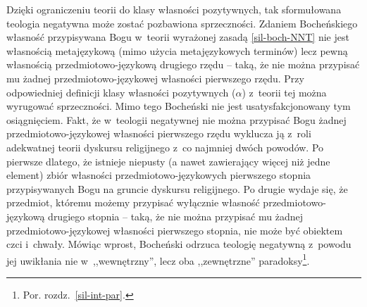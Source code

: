 
Dzięki ograniczeniu teorii do klasy własności pozytywnych, tak sformułowana teologia negatywna może zostać pozbawiona sprzeczności. Zdaniem Bocheńskiego własność przypisywana Bogu w~teorii wyrażonej zasadą \ref{sil-boch-NNT} nie jest własnością metajęzykową (mimo użycia metajęzykowych terminów) lecz pewną własnością prze\-dmio\-to\-wo-językową drugiego rzędu -- taką, że nie można przypisać mu żadnej prze\-dmio\-to\-wo-językowej własności pierwszego rzędu. Przy odpowiedniej definicji klasy własności pozytywnych ($\alpha$) z~teorii tej można wyrugować sprzeczności. Mimo tego Bocheński nie jest usatysfakcjonowany tym osiągnięciem. Fakt, że w~teologii negatywnej nie można przypisać Bogu żadnej przedmiotowo-językowej własności pierwszego rzędu wyklucza ją z~roli adekwatnej teorii dyskursu religijnego z~co najmniej dwóch powodów. Po pierwsze dlatego, że istnieje niepusty (a nawet zawierający więcej niż jedne element) zbiór własności przedmiotowo-językowych pierwszego stopnia przypisywanych Bogu na gruncie dyskursu religijnego. Po drugie wydaje się, że przedmiot, któremu możemy przypisać wyłącznie własność przedmiotowo-językową drugiego stopnia -- taką, że nie można przypisać mu żadnej przedmiotowo-językowej własności pierwszego stopnia, nie może być obiektem czci i~chwały. Mówiąc wprost, Bocheński odrzuca teologię negatywną z~powodu jej uwikłania nie w~,,wewnętrzny'', lecz oba ,,zewnętrzne'' paradoksy\footnote{Por. rozdz.~\ref{sil-int-par}.}.


